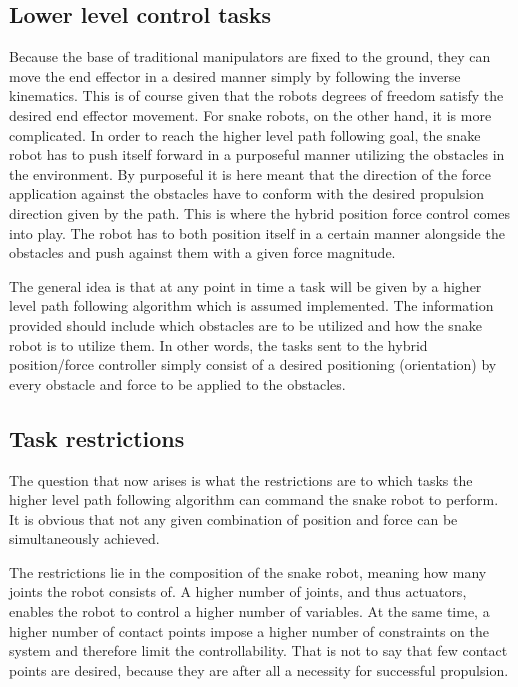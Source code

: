 \subsection{Lower level control tasks}

Because the base of traditional manipulators are fixed to the ground, they can move the end effector in a desired manner simply by following the inverse kinematics. This is of course given that the robots degrees of freedom satisfy the desired end effector movement. For snake robots, on the other hand, it is more complicated.
In order to reach the higher level path following goal, the snake robot has to push itself forward in a purposeful manner utilizing the obstacles in the environment. By purposeful it is here meant that the direction of the force application against the obstacles have to conform with the desired propulsion direction given by the path. This is where the hybrid position force control comes into play. The robot has to both position itself in a certain manner alongside the obstacles and push against them with a given force magnitude.

The general idea is that at any point in time a task will be given by a higher level path following algorithm which is assumed implemented. The information provided should include which obstacles are to be utilized and how the snake robot is to utilize them. In other words, the tasks sent to the hybrid position/force controller simply consist of a desired positioning (orientation) by every obstacle and force to be applied to the obstacles.



\subsection{Task restrictions}\label{subsec:task-restrictions}

The question that now arises is what the restrictions are to which tasks the higher level path following algorithm can command the snake robot to perform. It is obvious that not any given combination of position and force can be simultaneously achieved.

The restrictions lie in the composition of the snake robot, meaning how many joints the robot consists of. A higher number of joints, and thus actuators, enables the robot to control a higher number of variables. At the same time, a higher number of contact points impose a higher number of constraints on the system and therefore limit the controllability. That is not to say that few contact points are desired, because they are after all a necessity for successful propulsion.

